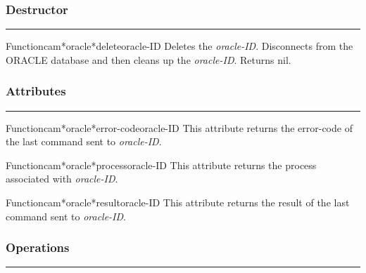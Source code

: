 \subsubsection*{Destructor}
\par\vspace*{0.00in}\par\hrule\par\medskip\par


\begin{functiondoc}{Function}{cam*oracle*delete}{oracle-ID}
Deletes the {\em oracle-ID}.  Disconnects from the ORACLE database and then
cleans up the {\em oracle-ID}.
Returns nil.
\end{functiondoc}


\subsubsection*{Attributes}
\par\vspace*{0.00in}\par\hrule\par\medskip\par


\begin{functiondoc}{Function}{cam*oracle*error-code}{oracle-ID}
This attribute returns the error-code of the last command sent to {\em oracle-ID}.
\end{functiondoc}

\begin{functiondoc}{Function}{cam*oracle*process}{oracle-ID}
This attribute returns the process associated with {\em oracle-ID}.
\end{functiondoc}

\begin{functiondoc}{Function}{cam*oracle*result}{oracle-ID}
This attribute returns the result of the last command sent to {\em oracle-ID}.
\end{functiondoc}


\subsubsection*{Operations}
\par\vspace*{0.00in}\par\hrule\par\medskip\par


